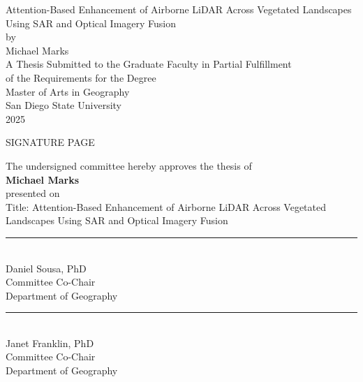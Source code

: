 \documentclass[12pt]{report}
\newcommand{\thesistitle}{Attention-Based Enhancement of Airborne LiDAR Across Vegetated Landscapes Using SAR and Optical Imagery Fusion}
\newcommand{\thesisauthor}{Michael Marks}
\newcommand{\thesisyear}{2025}
\newcommand{\thesisdegree}{Master of Arts in Geography}
\begin{document}

\begin{titlepage}
\begin{center}
\vspace*{1in}
{\Large \thesistitle}\\[2cm]

by\\[1cm]

{\Large \thesisauthor}\\[3cm]

A Thesis Submitted to the Graduate Faculty in Partial Fulfillment\\
of the Requirements for the Degree\\[1cm]

{\Large \thesisdegree}\\[1.5cm]

San Diego State University\\
\thesisyear

\vfill

\end{center}
\end{titlepage}

\newpage
\thispagestyle{empty}
\begin{center}
\vspace*{0.5in}
{\Large SIGNATURE PAGE}\\[1.5cm]
\end{center}

\noindent
The undersigned committee hereby approves the thesis of\\[0.3cm]
\textbf{\thesisauthor}\\[0.3cm]
presented on \underline{\hspace{3in}}\\[1.2cm]

\noindent
Title: \thesistitle\\[1.2cm]

\noindent
\rule{3in}{0.4pt}\\
Daniel Sousa, PhD\\
Committee Co-Chair\\
Department of Geography\\[1cm]

\noindent
\rule{3in}{0.4pt}\\
Janet Franklin, PhD\\
Committee Co-Chair\\
Department of Geography\\[1cm]
\end{document}
